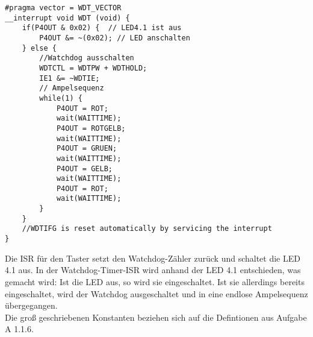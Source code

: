\documentclass[11pt,a4paper,ngerman]{article}
\begin{document}
\begin{description}
\begin{lstlisting}
#pragma vector = WDT_VECTOR
__interrupt void WDT (void) {
	if(P4OUT & 0x02) {	// LED4.1 ist aus
		P4OUT &= ~(0x02); // LED anschalten
	} else {
		//Watchdog ausschalten
		WDTCTL = WDTPW + WDTHOLD;
		IE1 &= ~WDTIE;
		// Ampelsequenz
		while(1) {
			P4OUT = ROT;
			wait(WAITTIME);
			P4OUT = ROTGELB;
			wait(WAITTIME);
			P4OUT = GRUEN;
			wait(WAITTIME);
			P4OUT = GELB;
			wait(WAITTIME);
			P4OUT = ROT;
			wait(WAITTIME);
		}
	}
	//WDTIFG is reset automatically by servicing the interrupt
}
\end{lstlisting}
Die ISR für den Taster setzt den Watchdog-Zähler zurück und schaltet die LED 4.1 aus. In der Watchdog-Timer-ISR wird anhand der LED 4.1 entschieden, was gemacht wird: Ist die LED aus, so wird sie eingeschaltet. Ist sie allerdings bereits eingeschaltet, wird der Watchdog ausgeschaltet und in eine endlose Ampelsequenz übergegangen.\\
Die groß geschriebenen Konstanten beziehen sich auf die Defintionen aus Aufgabe A 1.1.6.
\end{description}



\label{LastPage}
\end{document}
